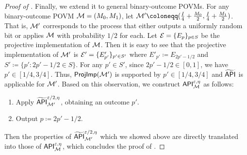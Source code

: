 \begin{proof}[Proof of ]
 Finally, we extend it to general binary-outcome POVMs. 
For any binary-outcome POVM $\mathcal{M}=(M_0,M_1)$,  let  $\mcal{M}' \coloneqq (\frac{I}{4}+\frac{M_0}{2},\frac{I}{4}+\frac{M_1}{2})$. 
That is, $\mathcal{M}'$ corresponds to the process that either outputs a uniformly random bit or applies $\mathcal{M}$  
with probability $1/2$ for each.   
Let $\mathcal{E}=\{E_p\}_{p\in S}$ be the projective implementation of $\mathcal{M}$. Then it is easy to see that 
the projective implementation of $\mathcal{M}'$ is 
$\mathcal{E'}=\{E'_{p'}\}_{p'\in S'}$
where $E'_{p'} \coloneqq E_{2p'-1/2}$ and $S' \coloneqq \{p': 2p'-1/2\in S\}$. 
For any $p'\in S'$, 
since 
$2p'-1/2\in [0,1]$, we have $p'\in [1/4,3/4]$.  
Thus, $\mathsf{ProjImp}(\mathcal{M}')$ is supported by $p'\in [1/4,3/4]$ and $\widetilde{\mathsf{API}}$ is applicable for $\mathcal{M}'$. 
Based on this observation, we construct $\mathsf{API}_{\mathcal{M}}^{\varepsilon,\eta}$ as follows:
\begin{enumerate}
\item Apply $\widetilde{\mathsf{API}}_{\mathcal{M}'}^{\varepsilon/2,\eta}$, obtaining an outcome $p'$.
\item Output $p \coloneqq 2p'-1/2$.
\end{enumerate}
Then the properties of $\widetilde{\mathsf{API}}_{\mathcal{M}'}^{\varepsilon/2,\eta}$ which we showed above are directly translated into those of $\mathsf{API}_{\mathcal{M}}^{\varepsilon,\eta}$, which concludes the proof of . 

\end{proof}



